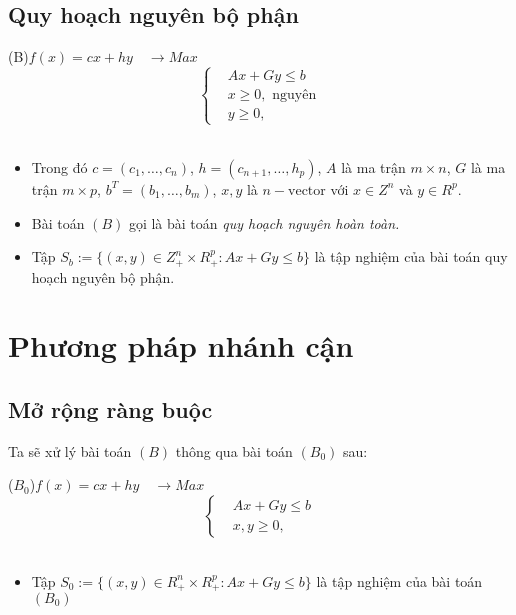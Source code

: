 \documentclass{beamer}
\begin{document}
\subsection{Quy hoạch nguyên bộ phận}
\begin{frame}
    \begin{center}                    
        \big(B\big)\quad $f(x)=cx+hy \quad \longrightarrow Max$ \\
        \[\left\{\begin{aligned}
            &Ax+Gy \leq  b \\
            &x\geq 0, \text{ nguyên} \\
            &y\geq 0,
        \end{aligned}\right.\]\\
    \end{center}
    \begin{itemize}
    \item Trong đó $c=(c_1,\ldots,c_n)$, $h=(c_{n+1},\ldots,h_p)$, $A$ là ma trận $m\times n$, $G$ là ma trận $m\times p$, $b^T=(b_1,\ldots,b_m)$, $x, y$ là $n-\text{vector}$ với $x\in Z^n$ và $y\in R^p$.
    \item Bài toán $(B)$ gọi là bài toán \textit{quy hoạch nguyên hoàn toàn.}
    \item Tập $S_b:=\{(x,y)\in Z^n_+\times R^p_+: Ax+Gy\leq b\}$ là tập nghiệm của bài toán quy hoạch nguyên bộ phận.
    \end{itemize}
\end{frame}
\section{Phương pháp nhánh cận}
\subsection{Mở rộng ràng buộc}
\begin{frame}
    Ta sẽ xử lý bài toán $(B)$ thông qua bài toán $(B_0)$ sau:
    \begin{center}                    
        \big($B_0$\big)\quad $f(x)=cx+hy \quad \longrightarrow Max$ \\
        \[\left\{\begin{aligned}
            &Ax+Gy \leq  b \\
            &x,y \geq 0,
        \end{aligned}\right.\]\\
    \end{center}
\begin{itemize}
\item Tập $S_0:=\{(x,y)\in R^n_+\times R^p_+: Ax+Gy\leq b\}$ là tập nghiệm của bài toán $(B_0)$
\end{itemize}
\end{frame}
\begin{frame}
    
\end{frame}
\end{document}
